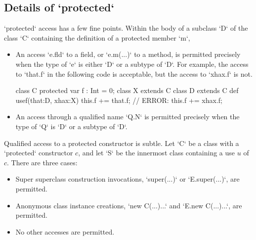 \subsection{Details of \xcd`protected`}
\label{sect:protected-details}

\xcd`protected` access has a few fine points. 
Within the body of a subclass \xcd`D` of the class \xcd`C` containing
the definition of a protected member \xcd`m`, 

\begin{itemize}

\item An access \xcd`e.fld` to a field, or \xcd`e.m(...)` to a method, is
      permitted precisely when the type of \xcd`e` is either \xcd`D` or a
      subtype of \xcd`D`.  
For example, the access to \xcd`that.f` in the following code is acceptable, but
the access to \xcd`xhax.f` is not.  
\begin{xten}
class C {
  protected var f : Int = 0;
}
class X extends C {}
class D extends C {
  def usef(that:D, xhax:X) {
     this.f += that.f; 
     // ERROR: this.f += xhax.f;
  }
}
\end{xten}
%


\item An access through a qualified name \xcd`Q.N` is permitted precisely when
      the type of \xcd`Q` is \xcd`D` or a subtype of \xcd`D`. 

\end{itemize}

Qualified access to a protected constructor is subtle.  Let \xcd`C` be a class
with a \xcd`protected` constructor $c$, and let \xcd`S` be the innermost
class containing a use $u$ of $c$.  There are three cases: 

\begin{itemize}
\item Super superclass construction invocations, \xcd`super(...)` or
      \xcd`E.super(...)`, are permitted.
\item Anonymous class instance creations, \xcd`new C(...){...}`
      and \xcd`E.new C(...){...}`, are
      permitted.
\item No other accesses are permitted. 
\end{itemize}

